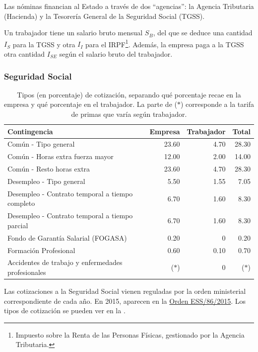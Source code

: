 \documentclass[nochap,palatino,shortheader]{apuntes}
\begin{document}
Las nóminas financian al Estado a través de dos ``agencias'': la Agencia Tributaria (Hacienda) y la Tesorería General de la Seguridad Social (TGSS).

Un trabajador tiene un salario bruto mensual $S_B$, del que se deduce una cantidad $I_S$ para la TGSS y otra $I_I$ para el IRPF\footnote{Impuesto sobre la Renta de las Personas Físicas, gestionado por la Agencia Tributaria.}. Además, la empresa paga a la TGSS otra cantidad $I_{SE}$ según el salario bruto del trabajador.

\subsubsection{Seguridad Social}

\begin{table}[hbtp]
\centering
\footnotesize
\begin{tabular}{l|r|r|r}
\textbf{Contingencia} & \textbf{Empresa} & \textbf{Trabajador} & \textbf{Total} \\ \toprule
Común - Tipo general & 23.60 & 4.70 & 28.30 \\
Común - Horas extra fuerza mayor & 12.00 & 2.00 & 14.00 \\
Común - Resto horas extra & 23.60 & 4.70 & 28.30 \\ \midrule
Desempleo - Tipo general & 5.50 & 1.55 & 7.05 \\
Desempleo - Contrato temporal a tiempo completo & 6.70 & 1.60 & 8.30 \\
Desempleo - Contrato temporal a tiempo parcial & 6.70 & 1.60 & 8.30 \\ \midrule
Fondo de Garantía Salarial (FOGASA) & 0.20 & 0 & 0.20 \\ \midrule
Formación Profesional & 0.60 & 0.10 & 0.70 \\ \midrule
Accidentes de trabajo y enfermedades profesionales & ($\ast$) & 0 & ($\ast$) \\ \midrule
\end{tabular}
\caption{Tipos (en porcentaje) de cotización, separando qué porcentaje recae en la empresa y qué porcentaje en el trabajador. La parte de ($\ast$) corresponde a la tarifa de primas que varía según trabajador.}
\label{tab:TiposSegSocial}
\end{table}

Las cotizaciones a la Seguridad Social vienen reguladas por la orden ministerial correspondiente de cada año. En 2015, aparecen en la \href{http://www.boe.es/diario_boe/txt.php?id=BOE-A-2015-847}{Orden ESS/86/2015}. Los tipos de cotización se pueden ver en la .
\end{document}
